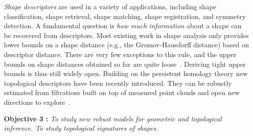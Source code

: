 {\em Shape descriptors} are used in a variety of applications, including shape classification, shape retrieval, shape matching, shape registration, and symmetry detection.  %
A fundamental question is {\em how much information} about a shape can be recovered from descriptors. Most existing work in shape analysis only provides lower bounds on a shape distance (e.g., the Gromov-Hausdorff distance) based on descriptor distance. There are very few exceptions to this rule, and the upper bounds on shape distances obtained so far are quite loose~\cite{bbk-gmds-06,ms-gh-05}. Deriving tight upper bounds is thus still widely open. 
Building on the persistent homology theory new topological descriptors have been recently introduced. They can be robustly estimated from filtrations built on top of measured point clouds  and open new directions to explore~\cite{ccgmo-ghsssp-09, socg-pbsds-10}.



\vspace{2mm}

{\bf Objective 3 :} {\em To study new {\em robust models for geometric and topological inference}.  To study topological signatures of shapes.}

